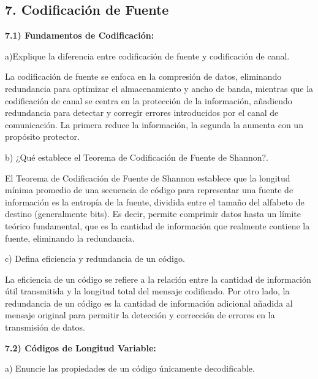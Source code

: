 \subsection*{7. Codificación de Fuente}

\noindent \textbf{7.1) Fundamentos de Codificación:}\par
\bigskip

\noindent a)Explique la diferencia entre codificación de fuente y codificación de canal.\par
\bigskip

\noindent La codificación de fuente se enfoca en la compresión de datos, eliminando redundancia para optimizar el almacenamiento y ancho de banda, mientras que la codificación de canal se centra en la protección de la información, añadiendo redundancia para detectar y corregir errores introducidos por el canal de comunicación. La primera reduce la información, la segunda la aumenta con un propósito protector.
\bigskip

\noindent b) ¿Qué establece el Teorema de Codificación de Fuente de Shannon?. \par
\bigskip
\noindent El Teorema de Codificación de Fuente de Shannon establece que la longitud mínima promedio de una secuencia de código para representar una fuente de información es la entropía de la fuente, dividida entre el tamaño del alfabeto de destino (generalmente bits). Es decir, permite comprimir datos hasta un límite teórico fundamental, que es la cantidad de información que realmente contiene la fuente, eliminando la redundancia. 
\bigskip

\noindent c) Defina eficiencia y redundancia de un código.\par
\bigskip

La eficiencia de un código se refiere a la relación entre la cantidad de información útil transmitida y la longitud total del mensaje codificado. Por otro lado, la redundancia de un código es la cantidad de información adicional añadida al mensaje original para permitir la detección y corrección de errores en la transmisión de datos. 
\bigskip
\bigskip

\noindent \textbf{7.2) Códigos de Longitud Variable:}
\bigskip

\noindent a) Enuncie las propiedades de un código únicamente decodificable. \par
\bigskip

